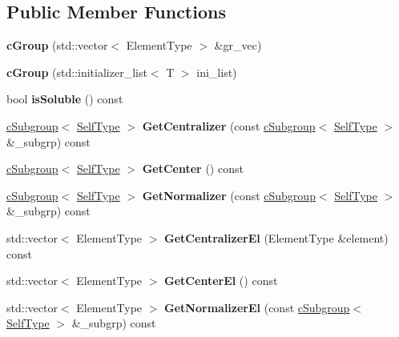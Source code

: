 \subsection*{\-Public \-Member \-Functions}
\begin{DoxyCompactItemize}
\item 
\hypertarget{classcGroup_a28f87c232c9d07ba9f9b0ec159e8243a}{
{\bfseries c\-Group} (std\-::vector$<$ \-Element\-Type $>$ \&gr\-\_\-vec)}
\label{classcGroup_a28f87c232c9d07ba9f9b0ec159e8243a}

\item 
\hypertarget{classcGroup_a38b515a0db10fa1fcebe7b635fc0d481}{
{\bfseries c\-Group} (std\-::initializer\-\_\-list$<$ \-T $>$ ini\-\_\-list)}
\label{classcGroup_a38b515a0db10fa1fcebe7b635fc0d481}

\item 
\hypertarget{classcGroup_acb69bf5f56805920d414a80ac5e54f36}{
bool {\bfseries is\-Soluble} () const }
\label{classcGroup_acb69bf5f56805920d414a80ac5e54f36}

\item 
\hypertarget{classcGroup_aeb4a24d613e509f3f62c1c5ff35bf6fa}{
\hyperlink{classcSubgroup}{c\-Subgroup}$<$ \hyperlink{classcGroup}{\-Self\-Type} $>$ {\bfseries \-Get\-Centralizer} (const \hyperlink{classcSubgroup}{c\-Subgroup}$<$ \hyperlink{classcGroup}{\-Self\-Type} $>$ \&\-\_\-subgrp) const }
\label{classcGroup_aeb4a24d613e509f3f62c1c5ff35bf6fa}

\item 
\hypertarget{classcGroup_a4d17719549b887692c2155fc2651cf72}{
\hyperlink{classcSubgroup}{c\-Subgroup}$<$ \hyperlink{classcGroup}{\-Self\-Type} $>$ {\bfseries \-Get\-Center} () const }
\label{classcGroup_a4d17719549b887692c2155fc2651cf72}

\item 
\hypertarget{classcGroup_a1bcc2cdb6db5251b23cd099b25ffa057}{
\hyperlink{classcSubgroup}{c\-Subgroup}$<$ \hyperlink{classcGroup}{\-Self\-Type} $>$ {\bfseries \-Get\-Normalizer} (const \hyperlink{classcSubgroup}{c\-Subgroup}$<$ \hyperlink{classcGroup}{\-Self\-Type} $>$ \&\-\_\-subgrp) const }
\label{classcGroup_a1bcc2cdb6db5251b23cd099b25ffa057}

\item 
\hypertarget{classcGroup_abe24cddf57cff0f63b5f24537eca9784}{
std\-::vector$<$ \-Element\-Type $>$ {\bfseries \-Get\-Centralizer\-El} (\-Element\-Type \&element) const }
\label{classcGroup_abe24cddf57cff0f63b5f24537eca9784}

\item 
\hypertarget{classcGroup_a09c9a617410517ccefc53214ba8e9e91}{
std\-::vector$<$ \-Element\-Type $>$ {\bfseries \-Get\-Center\-El} () const }
\label{classcGroup_a09c9a617410517ccefc53214ba8e9e91}

\item 
\hypertarget{classcGroup_a442a90478046593d38f5d131eb22b9a9}{
std\-::vector$<$ \-Element\-Type $>$ {\bfseries \-Get\-Normalizer\-El} (const \hyperlink{classcSubgroup}{c\-Subgroup}$<$ \hyperlink{classcGroup}{\-Self\-Type} $>$ \&\-\_\-subgrp) const }
\label{classcGroup_a442a90478046593d38f5d131eb22b9a9}

\end{DoxyCompactItemize}
